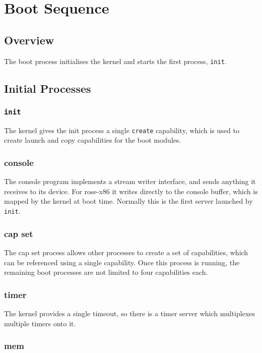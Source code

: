 \chapter{Boot Sequence}

\section{Overview}

The boot process initialises the kernel and starts the first process, {\tt init}.

\section{Initial Processes}

\subsection{{\tt init}}

The kernel gives the init process a single {\tt create} capability, which is used to create launch and copy capabilities for the boot modules.

\subsection{console}

The console program implements a stream writer interface, and sends anything it receives to its device.  For rose-x86 it writes directly to the console buffer, which is mapped by the kernel at boot time.  Normally this is the first server launched by {\tt init}.

\subsection{cap set}

The cap set process allows other processes to create a set of capabilities, which can be referenced using a single capability.  Once this process is running, the remaining boot processes are not limited to four capabilities each.

\subsection{timer}

The kernel provides a single timeout, so there is a timer server which multiplexes multiple timers onto it.

\subsection{mem}

